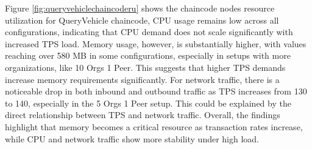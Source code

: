 Figure \ref{fig:queryvehiclechaincoderu}
shows the chaincode nodes resource utilization for QueryVehicle chaincode, CPU usage remains low across all configurations,
indicating that CPU demand does not scale significantly with increased TPS load. Memory usage, however, is substantially higher, with values
reaching over 580 MB in some configurations, especially in setups with more organizations, like 10 Orgs 1 Peer. This suggests that higher
TPS demands increase memory requirements significantly. For network traffic, there is a noticeable drop in both inbound and outbound traffic
as TPS increases from 130 to 140, especially in the 5 Orgs 1 Peer setup. This could be explained by the direct relationship between TPS and
network traffic. Overall, the findings highlight that memory becomes a critical resource as transaction rates increase, while CPU and
network traffic show more stability under high load.

